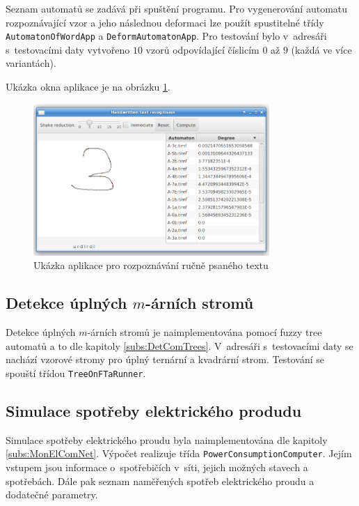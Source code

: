 Seznam automatů se zadává při spuštění programu. Pro vygenerování automatu rozpoznávající vzor a jeho následnou deformaci lze použít spustitelné třídy \verb|AutomatonOfWordApp| a \verb|DeformAutomatonApp|. Pro testování bylo v~adresáři s~testovacími daty vytvořeno $10$ vzorů odpovídající číslicím $0$ až $9$ (každá ve více variantách). 

Ukázka okna aplikace je na obrázku \ref{img:HandWritScreen}.

\begin{figure}
 \centering
 \includegraphics[width=0.8\textwidth]{genimg-handwritrec-screen}
 \caption{Ukázka aplikace pro rozpoznávání ručně psaného textu} \label{img:HandWritScreen}
\end{figure}

\subsection{Detekce úplných $m$-árních stromů}
Detekce úplných $m$-árních stromů je naimplementována pomocí fuzzy tree automatů a to dle kapitoly \ref{subs:DetComTrees}. V~adresáři s~testovacími daty se nachází vzorové stromy pro úplný ternární a kvadrární strom. Testování se spouští třídou \verb|TreeOnFTaRunner|.

\subsection{Simulace spotřeby elektrického produdu}
Simulace spotřeby elektrického proudu byla naimplementována dle kapitoly \ref{subs:MonElComNet}. Výpočet realizuje třída \verb|PowerConsumptionComputer|. Jejím vstupem jsou informace o~spotřebičích v~síti, jejich možných stavech a spotřebách. Dále pak seznam naměřených spotřeb elektrického proudu a dodatečné parametry. 

